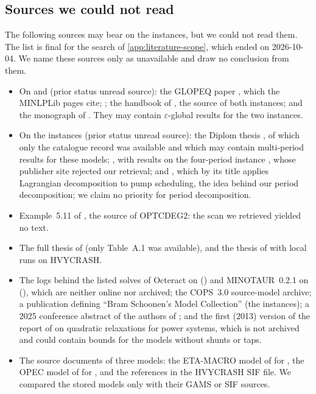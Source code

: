 \subsection{Sources we could not read}\label{app:literature-unread}

The following sources may bear on the instances, but we could not read them.
The list is final for the search of \cref{app:literature-scope}, which ended on 2026-10-04.
We name these sources only as unavailable and draw no conclusion from them.
\begin{itemize}
\setlength{\itemsep}{0pt}
\item On  and  (prior status unread source): the GLOPEQ paper \citet{mcdonald1997-glopeq-a-new-computational-tool}, which the MINLPLib pages cite; \citet{mcdonald1994-decomposition-based-and-branch-and}; the handbook of \citet{floudas1999-handbook-of-test-problems-in}, the source of both instances; and the monograph of \citet{floudas2000-deterministic-global-optimization-theory-methods}.
  They may contain $\varepsilon$-global results for the two instances.
\item On the  instances (prior status unread source): the Diplom thesis \citet{huang2011-operative-planning-of-water-supply}, of which only the catalogue record was available and which may contain multi-period results for these models;
  \citet{karia2022-assessment-of-a-two-step}, with results on the four-period instance , whose publisher site rejected our retrieval;
  and \citet{ghaddar2015-a-lagrangian-decomposition-approach-for}, which by its title applies Lagrangian decomposition to pump scheduling, the idea behind our period decomposition; we claim no priority for period decomposition.
\item Example~5.11 of \citet{murtagh1982-a-projected-lagrangian-algorithm-and}, the source of OPTCDEG2: the scan we retrieved yielded no text.
\item The full thesis of \citet{smith2011-smith-thesis-coconut-table-a} (only Table~A.1 was available), and the thesis of \citet{prudente2012-inviabilidade-em-metodos-de-lagrangiano} with local runs on HVYCRASH.
\item The logs behind the listed solves of Octeract on  () and MINOTAUR~0.2.1 on  (), which are neither online nor archived; the COPS~3.0 source-model archive; a publication defining ``Bram Schoonen's Model Collection'' (the  instances); a 2025 conference abstract of the authors of \citet{karia2025-deterministic-global-optimization-over-trained}; and the first (2013) version of the report of \citet{hijazi2014-convex-quadratic-relaxations-of-nonlinear} on quadratic relaxations for power systems, which is not archived and could contain bounds for the models without shunts or taps.
\item The source documents of three models: the ETA-MACRO model of \citet{manne1977-eta-macro-a-model-of} for , the OPEC model of \citet{pindyck1978-gains-to-producers-from-the} for , and the references in the HVYCRASH SIF file. We compared the stored models only with their GAMS or SIF sources.
\end{itemize}
